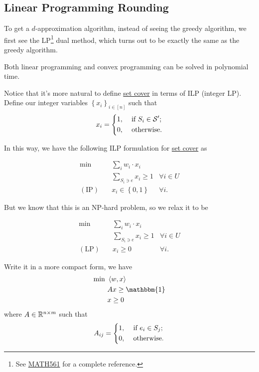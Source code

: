 
\subsection{Linear Programming Rounding}

To get a \(d\)-approximation algorithm, instead of seeing the greedy algorithm, we first see the LP\footnote{See \href{https://www.pbb.wtf/posts/Notes\#linear-programming-math561ioe510to518-umich}{MATH561} for a complete reference.} dual method, which turns out to be exactly the same as the greedy algorithm.

\begin{prev}
	Both linear programming and convex programming can be solved in polynomial time.
\end{prev}

Notice that it's more natural to define \hyperref[prb:set-cover]{set cover} in terms of ILP (integer LP). Define our integer variables \(\left\{ x_i \right\} _{i\in [n]}\) such that
\[
	x_i = \begin{dcases}
		1, & \text{ if } S_i\in \mathcal{\MakeUppercase{S}} ^\prime  ; \\
		0, & \text{ otherwise}.
	\end{dcases}
\]

In this way, we have the following ILP formulation for \hyperref[prb:set-cover]{set cover} as

\begin{align*}
	\min~            & \sum_{i} w_i \cdot x_i                           \\
	                 & \sum_{S_i\ni e}x_{i} \geq 1     & \forall i\in U \\
	(\text{IP})\quad & x_{i} \in \left\{ 0, 1 \right\} & \forall i.
\end{align*}

But we know that this is an NP-hard problem, so we relax it to be

\begin{align*}
	\min~            & \sum_{i} w_i \cdot x_i                       \\
	                 & \sum_{S_i\ni e}x_{i} \geq 1 & \forall i\in U \\
	(\text{LP})\quad & x_{i} \geq 0                & \forall i.
\end{align*}

Write it in a more compact form, we have
\begin{align*}
	\min~ & \left\langle w, x \right\rangle \\
	      & Ax \geq \mathbbm{1}             \\
	      & x\geq 0
\end{align*}
where \(A\in \mathbb{\MakeUppercase{r}} ^{n\times m}\) such that
\[
	A_{ij} = \begin{dcases}
		1, & \text{ if } e_i\in S_j ; \\
		0, & \text{ otherwise}.
	\end{dcases}
\]

